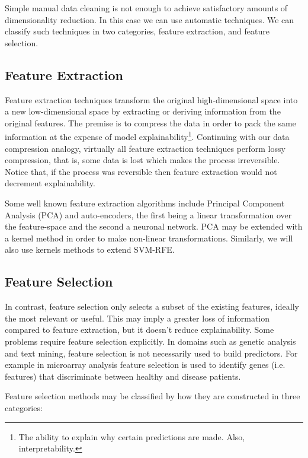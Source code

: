 Simple manual data cleaning is not enough to achieve satisfactory amounts of dimensionality reduction. In this case we can use automatic techniques. We can classify such techniques in two categories, feature extraction, and feature selection.

\subsection{Feature Extraction}

Feature extraction techniques transform the original high-dimensional space into a new low-dimensional space by extracting or deriving information from the original features. The premise is to compress the data in order to pack the same information at the expense of model explainability\footnote{The ability to explain why certain predictions are made. Also, interpretability.}. Continuing with our data compression analogy, virtually all feature extraction techniques perform lossy com\-pres\-sion, that is, some data is lost which makes the process irreversible. Notice that, if the process was reversible then feature extraction would not decrement explainability.

Some well known feature extraction algorithms include Principal Component Analysis (PCA) and auto-encoders, the first being a linear transformation over the feature-space and the second a neuronal network. PCA may be extended with a kernel method in order to make non-linear transformations. Similarly, we will also use kernels methods to extend SVM-RFE.

\subsection{Feature Selection}

In contrast, feature selection only selects a subset of the existing features, ideally the most relevant or useful. This may imply a greater loss of information compared to feature extraction, but it doesn't reduce explainability. Some problems require feature selection explicitly. In domains such as genetic analysis and text mining, feature selection is not necessarily used to build predictors. For example in micro\-array analysis feature selection is used to identify genes (i.e. features) that dis\-criminate between healthy and disease patients. 

Feature selection methods may be classified by how they are constructed in three categories:

